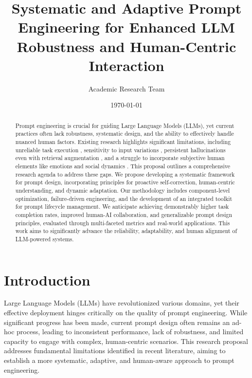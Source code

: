 \documentclass{article}
\title{Systematic and Adaptive Prompt Engineering for Enhanced LLM Robustness and Human-Centric Interaction}
\author{Academic Research Team}
\date{\today}
\newcommand{\citePone}{\cite{paper1}}
\newcommand{\citePtwo}{\cite{paper2}}
\newcommand{\citePthree}{\cite{paper3}}
\newcommand{\citePfive}{\cite{paper5}}
\begin{document}
\maketitle

\begin{abstract}
Prompt engineering is crucial for guiding Large Language Models (LLMs), yet current practices often lack robustness, systematic design, and the ability to effectively handle nuanced human factors. Existing research highlights significant limitations, including unreliable task execution \citePone{}, sensitivity to input variations \citePthree{}, persistent hallucinations even with retrieval augmentation \citePfive{}, and a struggle to incorporate subjective human elements like emotions and social dynamics \citePtwo{}. This proposal outlines a comprehensive research agenda to address these gaps. We propose developing a systematic framework for prompt design, incorporating principles for proactive self-correction, human-centric understanding, and dynamic adaptation. Our methodology includes component-level optimization, failure-driven engineering, and the development of an integrated toolkit for prompt lifecycle management. We anticipate achieving demonstrably higher task completion rates, improved human-AI collaboration, and generalizable prompt design principles, evaluated through multi-faceted metrics and real-world applications. This work aims to significantly advance the reliability, adaptability, and human alignment of LLM-powered systems.
\end{abstract}

\section{Introduction}
Large Language Models (LLMs) have revolutionized various domains, yet their effective deployment hinges critically on the quality of prompt engineering. While significant progress has been made, current prompt design often remains an ad-hoc process, leading to inconsistent performance, lack of robustness, and limited capacity to engage with complex, human-centric scenarios. This research proposal addresses fundamental limitations identified in recent literature, aiming to establish a more systematic, adaptive, and human-aware approach to prompt engineering.
\end{document}
